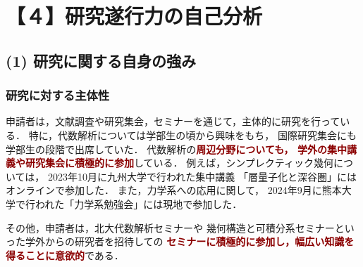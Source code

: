 \documentclass[11pt,a4paper,uplatex,dvipdfmx]{ujarticle} 		%
\newcommand{\研究課題名}{打切り超局所台の関手的性質の研究とMorse理論への応用}
\newcommand{\研究機関名}{北海道大学}
\newcommand{\研究代表者氏名}{大柴寿浩}
\begin{document}





\section{【４】研究遂行力の自己分析}

\subsection*{(1) 研究に関する自身の強み}
\subsubsection*{研究に対する主体性}
申請者は，文献調査や研究集会，セミナーを通じて，主体的に研究を行っている．
特に，代数解析については学部生の頃から興味をもち，
国際研究集会にも学部生の段階で出席していた．
代数解析の\textcolor{darkred}{\textbf{周辺分野についても，
学外の集中講義や研究集会に積極的に参加}}している．
例えば，シンプレクティック幾何については，
2023年10月に九州大学で行われた集中講義
「層量子化と深谷圏」にはオンラインで参加した．
また，力学系への応用に関して，
2024年9月に熊本大学で行われた「力学系勉強会」には現地で参加した．

その他，申請者は，北大代数解析セミナーや
幾何構造と可積分系セミナーといった学外からの研究者を招待しての
\textcolor{darkred}{\textbf{セミナーに積極的に参加し，幅広い知識を得ることに意欲的}}である．
\end{document}
